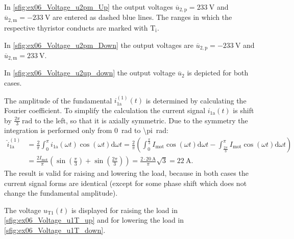 \begin{solutionblock}
    In \autoref{sfig:ex06_Voltage_u2pm_Up} the output voltages $\overline{u}_\mathrm{2,p}=\SI{233}{\volt}$ and $\overline{u}_\mathrm{2,m}=\SI{-233}{\volt}$
    are entered as dashed blue lines. The ranges in which the respective thyristor conducts are marked with $\mathrm{T_i}$.
    
    

    In \autoref{sfig:ex06_Voltage_u2pm_Down} the output voltages are $\overline{u}_\mathrm{2,p}=\SI{-233}{\volt}$ and $\overline{u}_\mathrm{2,m}=\SI{233}{\volt}$.
    
    

    

    \FloatBarrier

    In \autoref{sfig:ex06_Voltage_u2up_down} the output voltage $\overline{u}_\mathrm{2}$ is depicted for both cases.

    

    \FloatBarrier

    The amplitude of the fundamental $i_\mathrm{1a}^\mathrm{(1)}(t)$ is determined by calculating the Fourier coefficient.
    To simplify the calculation the current signal $i_\mathrm{1a}(t)$ is shift by $\frac{2 \pi}{3}\SI{}{\radian}$ to the left, 
    so that it is axially symmetric. Due to the symmetry the integration is performed only from \SI{0}{\radian} to \SI{\pi}{\radian}:
    \begin{equation}
        \begin{split}
            \hat{i}_\mathrm{1a}^\mathrm{(1)} &= \frac{2}{\pi} \int_{0}^{\pi} i_\mathrm{1a}(\omega t) \cos(\omega t) \mathrm{d}\omega t=
            \frac{2}{\pi} \left( \int_{0}^{\frac{\pi}{3}} I_\mathrm{mot} \cos(\omega t) \mathrm{d}\omega t 
            - \int_{\frac{2\pi}{3}}^{\pi} I_\mathrm{mot} \cos(\omega t) \mathrm{d}\omega t \right)  \\
            &= \frac{2 I_\mathrm{mot}}{\pi} \left( \sin(\frac{\pi}{3}) + \sin(\frac{2\pi}{3}) \right) 
            = \frac{2\cdot \SI{20}{\ampere}}{\pi} \sqrt{3}= \SI{22}{\ampere}.
        \end{split}
    \end{equation}
    The result is valid for raising and lowering the load, because in both cases the current signal 
    forms are identical (except for some phase shift which does not change the fundamental amplitude).

    

    
    
    \FloatBarrier

    The voltage $u_\mathrm{T1}(t)$ is displayed for raising the load in \autoref{sfig:ex06_Voltage_u1T_up}  and for lowering the load in \autoref{sfig:ex06_Voltage_u1T_down}.

    

    
    
\end{solutionblock}

